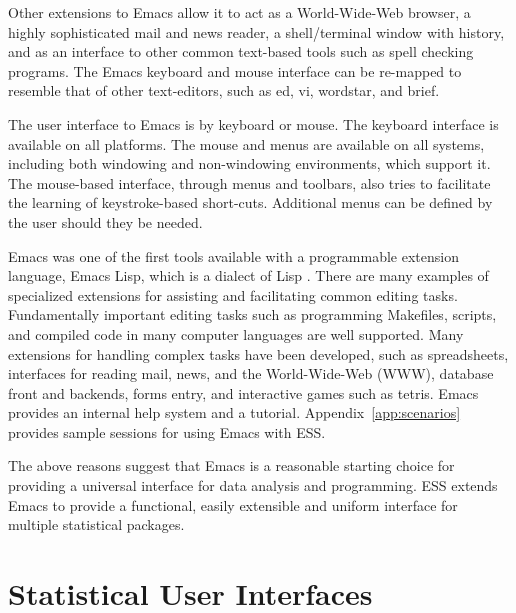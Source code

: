 \documentclass{article}
\begin{document}
Other extensions to Emacs allow it to act as a World-Wide-Web browser,
a highly sophisticated mail and news reader, a shell/terminal window
with history, and as an interface to other common text-based tools
such as spell checking programs.  The Emacs keyboard and mouse
interface can be re-mapped to resemble that of other text-editors,
such as ed, vi, wordstar, and brief.

The user interface to Emacs is by keyboard or mouse.  The keyboard
interface is available on all platforms.  The mouse and menus are
available on all systems, including both windowing and non-windowing
environments, which support it.  The mouse-based interface, through
menus and toolbars, also tries to facilitate the learning of
keystroke-based short-cuts.  Additional menus can be defined by the
user should they be needed.

Emacs was one of the first tools available with a programmable
extension language, Emacs Lisp, which is a dialect of Lisp
\citep{RChassell1999,PGraham:1996}.  There are many examples of
specialized extensions for assisting and facilitating common editing
tasks.  Fundamentally important editing tasks such as programming
Makefiles, scripts, and compiled code in many computer languages are
well supported.  Many extensions for handling complex tasks have been
developed, such as spreadsheets, interfaces for reading mail, news,
and the World-Wide-Web (WWW), database front and backends, forms
entry, and interactive games such as tetris.  Emacs provides an
internal help system and a tutorial.  Appendix~\ref{app:scenarios}
provides sample sessions for using Emacs with ESS.

The above reasons suggest that Emacs is a reasonable starting choice
for providing a universal interface for data analysis and programming.
ESS extends Emacs to provide a functional, easily extensible and uniform
interface for multiple statistical packages.  


\section{Statistical User Interfaces}
\label{sec:UI}
\end{document}
